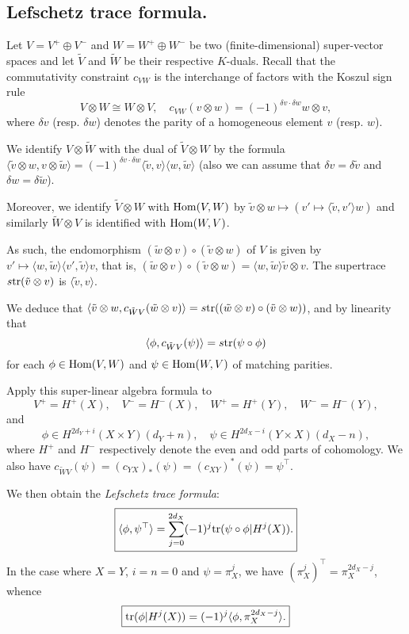 \documentclass[../main.tex]{subfiles}
\begin{document}
\subsection{Lefschetz trace formula.} Let $V = V^+ \oplus V^-$ and $W = W^+ \oplus W^-$ be two (finite-dimensional) super-vector spaces and let $\tilde{V}$ and $\tilde{W}$ be their respective $K$-duals.
Recall that the commutativity constraint $c_{VW}$ is the interchange of factors with the Koszul sign rule
$$V \otimes W \cong W \otimes V,\quad c_{VW}(v \otimes w) = (-1)^{\delta v \cdot \delta w} w \otimes v,$$
where $\delta v$ (resp. $\delta w$) denotes the parity of a homogeneous element $v$ (resp. $w$).

We identify $V \otimes \tilde{W}$ with the dual of $\tilde{V} \otimes W$ by the formula $\langle \tilde{v} \otimes w, v \otimes \tilde{w}\rangle = (-1)^{\delta v \cdot \delta w} \langle \tilde{v}, v\rangle\langle w, \tilde{w}\rangle$ (also we can assume that $\delta v = \delta \tilde{v}$ and $\delta w = \delta \tilde{w}$).

Moreover, we identify $\tilde{V} \otimes W$ with $\operatorname{Hom}(V, W)$ by $\tilde{v} \otimes w \mapsto (v' \mapsto \langle \tilde{v}, v'\rangle w)$ and similarly $\tilde{W} \otimes V$ is identified with $\operatorname{Hom}(W, V)$.

As such, the endomorphism $(\tilde{w} \otimes v) \circ (\tilde{v} \otimes w)$ of $V$ is given by $v' \mapsto \langle w, \tilde{w} \rangle \langle v', \tilde{v} \rangle v$, that is, $(\tilde{w} \otimes v) \circ (\tilde{v} \otimes w) = \langle w, \tilde{w} \rangle \tilde{v} \otimes v$.
The supertrace $s\mathrm{tr}(\tilde{v} \otimes v)$ is $\langle \tilde{v}, v\rangle$.

We deduce that $\langle \tilde{v} \otimes w, c_{\tilde{W}V}(\tilde{w} \otimes v)\rangle = s\mathrm{tr}((\tilde{w} \otimes v) \circ (\tilde{v} \otimes w))$, and by linearity that
$$\langle \phi, c_{\tilde{W}V}(\psi)\rangle = s\mathrm{tr}(\psi \circ \phi)$$
for each $\phi \in \operatorname{Hom}(V, W)$ and $\psi \in \operatorname{Hom}(W, V)$ of matching parities.

Apply this super-linear algebra formula to
$$V^+ = H^+(X),\quad V^- = H^-(X),\quad W^+ = H^+(Y),\quad W^- = H^-(Y),$$
and
$$\phi \in H^{2d_Y + i}(X \times Y)(d_Y + n),\quad \psi \in H^{2d_X - i}(Y \times X)(d_X - n),$$
where $H^+$ and $H^-$ respectively denote the even and odd parts of cohomology.
We also have $c_{\tilde{W}V}(\psi) = (c_{YX})_*(\psi) = (c_{XY})^*(\psi) = \psi^{\top}$.

We then obtain the \emph{Lefschetz trace formula}:
$$\boxed{\langle \phi, \psi^{\top} \rangle = \sum_{j = 0}^{2d_X} (-1)^j \mathrm{tr}(\psi \circ \phi | H^j(X)).}$$
In the case where $X = Y$, $i = n = 0$ and $\psi = \pi_X^j$, we have $(\pi_X^j)^{\top} = \pi_X^{2d_X - j}$, whence
$$\boxed{\mathrm{tr}(\phi | H^j(X)) = (-1)^j \langle \phi, \pi_X^{2d_X - j} \rangle.}$$
\end{document}

